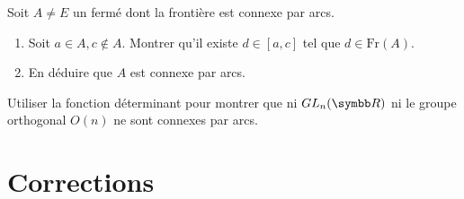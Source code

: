 \begin{exercice}
    Soit $A \neq E$ un fermé dont la frontière est connexe par arcs.
    \begin{enumerate}
        \item Soit $a \in A, c \notin A$. Montrer qu'il existe $d \in [a,c]$ tel que $d \in \text{Fr}(A)$.
        \item En déduire que $A$ est connexe par arcs.
    \end{enumerate}
\end{exercice}

\begin{exercice}
    Utiliser la fonction déterminant pour montrer que ni $GL_{n}(\R)$ 
    ni le groupe orthogonal $O(n)$ ne sont connexes par arcs.
\end{exercice}

\newpage
\section{Corrections}

